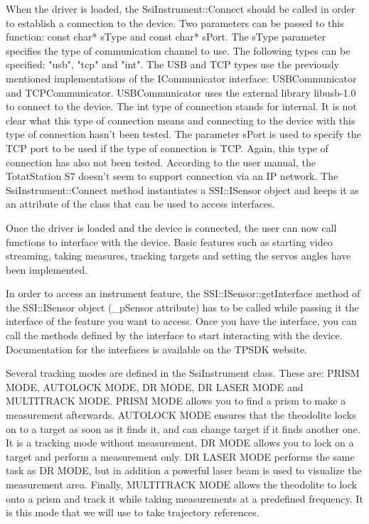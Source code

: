 \documentclass[10pt,letterpaper,oneside]{article}
\begin{document}
When the driver is loaded, the SsiInstrument::Connect should be called in order to establish a connection to the device. 
Two parameters can be passed to this function: const char* sType and const char* sPort. 
The sType parameter specifies the type of communication channel to use. 
The following types can be specified: "usb", "tcp" and "int". 
The USB and TCP types use the previously mentioned implementations of the ICommunicator interface: USBCommunicator and TCPCommunicator. 
USBCommunicator uses the external library libusb-1.0 to connect to the device. 
The int type of connection stands for internal. 
It is not clear what this type of connection means and connecting to the device with this type of connection hasn't been tested. 
The parameter sPort is used to specify the TCP port to be used if the type of connection is TCP.
Again, this type of connection has also not been tested. 
According to the user manual, the TotatStation S7 doesn't seem to support connection via an IP network. 
The SsiInstrument::Connect method instantiates a SSI::ISensor object and keeps it as an attribute of the class that can be used to access interfaces.

Once the driver is loaded and the device is connected, the user can now call functions to interface with the device. 
Basic features such as starting video streaming, taking measures, tracking targets and setting the servos angles have been implemented.

In order to access an instrument feature, the SSI::ISensor::getInterface method of the SSI::ISensor object (\_pSensor attribute) has to be called while passing it the interface of the feature you want to access. 
Once you have the interface, you can call the methods defined by the interface to start interacting with the device. 
Documentation for the interfaces is available on the TPSDK website.

Several tracking modes are defined in the SsiInstrument class.
These are: PRISM MODE, AUTOLOCK MODE, DR MODE, DR LASER MODE and MULTITRACK MODE.
PRISM MODE allows you to find a prism to make a measurement afterwards.
AUTOLOCK MODE ensures that the theodolite locks on to a target as soon as it finds it, and can change target if it finds another one.
It is a tracking mode without measurement.
DR MODE allows you to lock on a target and perform a measurement only.
DR LASER MODE performs the same task as DR MODE, but in addition a powerful laser beam is used to visualize the measurement area.
Finally, MULTITRACK MODE allows the theodolite to lock onto a prism and track it while taking measurements at a predefined frequency.
It is this mode that we will use to take trajectory references.
\end{document}
